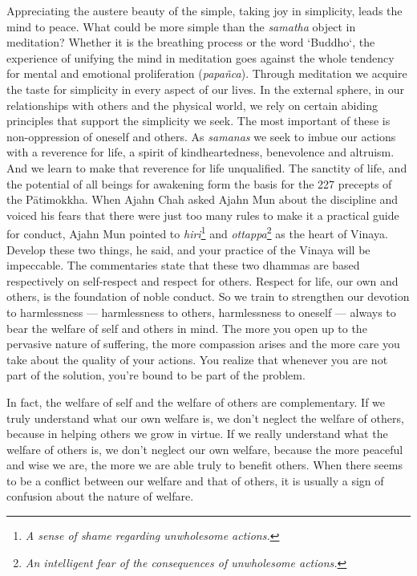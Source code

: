Appreciating the austere beauty of the simple, taking joy in simplicity,
leads the mind to peace. What could be more simple than the
\emph{samatha} object in meditation? Whether it is the breathing process
or the word `Buddho`, the experience of unifying the mind in meditation
goes against the whole tendency for mental and emotional proliferation
(\emph{papañca}). Through meditation we acquire the taste for simplicity
in every aspect of our lives. In the external sphere, in our
relationships with others and the physical world, we rely on certain
abiding principles that support the simplicity we seek. The most
important of these is non-oppression of oneself and others. As
\emph{samanas} we seek to imbue our actions with a reverence for life, a
spirit of kindheartedness, benevolence and altruism. And we learn to
make that reverence for life unqualified. The sanctity of life, and the
potential of all beings for awakening form the basis for the 227
precepts of the Pātimokkha. When Ajahn Chah asked Ajahn Mun about the
discipline and voiced his fears that there were just too many rules to
make it a practical guide for conduct, Ajahn Mun pointed to
\emph{hiri}\footnote{\emph{A sense of shame regarding unwholesome
  actions.}} and \emph{ottappa}\footnote{\emph{An intelligent fear of
  the consequences of unwholesome actions.}} as the heart of Vinaya.
Develop these two things, he said, and your practice of the Vinaya will
be impeccable. The commentaries state that these two dhammas are based
respectively on self-respect and respect for others. Respect for life,
our own and others, is the foundation of noble conduct. So we train to
strengthen our devotion to harmlessness --- harmlessness to others,
harmlessness to oneself --- always to bear the welfare of self and
others in mind. The more you open up to the pervasive nature of
suffering, the more compassion arises and the more care you take about
the quality of your actions. You realize that whenever you are not part
of the solution, you're bound to be part of the problem.

In fact, the welfare of self and the welfare of others are
complementary. If we truly understand what our own welfare is, we don't
neglect the welfare of others, because in helping others we grow in
virtue. If we really understand what the welfare of others is, we don't
neglect our own welfare, because the more peaceful and wise we are, the
more we are able truly to benefit others. When there seems to be a
conflict between our welfare and that of others, it is usually a sign of
confusion about the nature of welfare.

